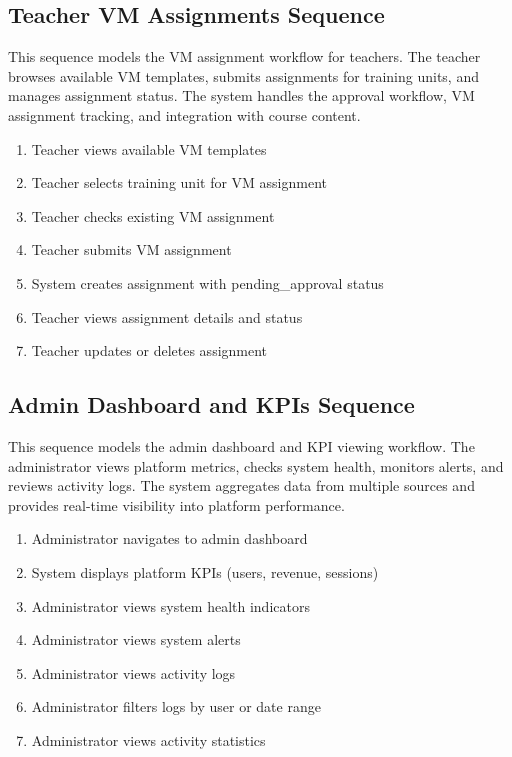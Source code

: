 
\subsection{Teacher VM Assignments Sequence}
This sequence models the VM assignment workflow for teachers. The teacher
browses available VM templates, submits assignments for training units, and
manages assignment status. The system handles the approval workflow, VM
assignment tracking, and integration with course content.

\begin{enumerate}[topsep=0pt,itemsep=1pt,parsep=0pt,partopsep=0pt]
    \item Teacher views available VM templates
    \item Teacher selects training unit for VM assignment
    \item Teacher checks existing VM assignment
    \item Teacher submits VM assignment
    \item System creates assignment with pending\_approval status
    \item Teacher views assignment details and status
    \item Teacher updates or deletes assignment
\end{enumerate}


\subsection{Admin Dashboard and KPIs Sequence}
This sequence models the admin dashboard and KPI viewing workflow. The
administrator views platform metrics, checks system health, monitors alerts,
and reviews activity logs. The system aggregates data from multiple sources and
provides real-time visibility into platform performance.

\begin{enumerate}[topsep=0pt,itemsep=1pt,parsep=0pt,partopsep=0pt]
    \item Administrator navigates to admin dashboard
    \item System displays platform KPIs (users, revenue, sessions)
    \item Administrator views system health indicators
    \item Administrator views system alerts
    \item Administrator views activity logs
    \item Administrator filters logs by user or date range
    \item Administrator views activity statistics
\end{enumerate}

